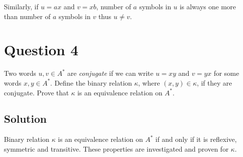 Similarly, if $u = ax$ and $v = xb$, number of $a$ symbols in $u$ is always one more than number of $a$ symbols in $v$ thus $u \neq v$.

\section{Question 4}

Two words $u, v \in A^*$ are \textit{conjugate} if we can write $u=xy$ and $v=yx$ for some words $x,y \in A^*$.
Define the binary relation $\kappa$, where $\left( x,y \right) \in \kappa$, if they are conjugate.
Prove that $\kappa$ is an equivalence relation on $A^* $.

\subsection*{Solution}

Binary relation $\kappa$ is an equivalence relation on $A^*$ if and only if it is reflexive, symmetric and transitive. These properties are investigated and proven for $\kappa$.

